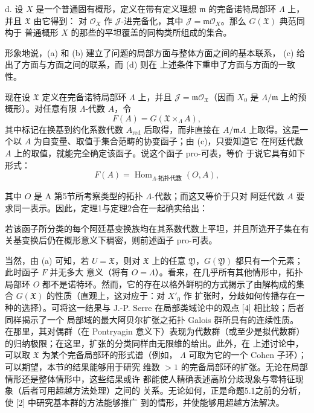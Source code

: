 \noindent d. 设 $X$ 是一个普通固有概形，定义在带有定义理想 $\mathfrak m$
的完备诺特局部环 $\Lambda$ 上，并且 $\mathfrak X$ 由它得到：
对 $\mathcal O_X$ 作 $\mathcal J$-进完备化，其中
$\mathcal J=\mathfrak m\mathcal O_X$。那么 $G(\mathfrak X)$ 典范同构于
普通概形 $X$ 的那些的平坦覆盖的同构类所组成的集合。

形象地说，(a) 和 (b) 建立了问题的局部方面与整体方面之间的基本联系，
(c) 给出了方面与方面之间的联系，而 (d) 则在
上述条件下重申了方面与方面的一致性。

现在设 $\mathfrak X$ 定义在完备诺特局部环 $\Lambda$ 上，并且
$\mathcal J=\mathfrak m\mathcal O_{\mathfrak X}$（因而 $X_0$ 是
$\Lambda/\mathfrak m$ 上的预概形）。对任意有限 $\Lambda$-代数 $A$，令
\[
  F(A)=G(\mathfrak X\times_\Lambda A),
\]
其中标记在换基到约化系数代数 $A_{\mathrm{red}}$ 后取得，而非直接在 $A/\mathfrak mA$ 上取得。这是一个以 $A$ 为自变量、取值于集合范畴的协变函子；由 (c)，只要知道它
在阿廷代数 $A$ 上的取值，就能完全确定该函子。说这个函子 pro-可表，等价
于说它具有如下形式：
\[
  F(A)=\operatorname{Hom}_{\Lambda\text{-拓扑代数}}(O,A),
\]

其中 $O$ 是 A 第5节所考察类型的拓扑 $\Lambda$-代数；而这又等价于只对
阿廷代数 $A$ 要求同一表示。因此，定理1与定理2合在一起确实给出：

 若该函子所分类的每个阿廷基变换族均在其系数代数上平坦，并且所选开子集在有关基变换后仍在概形意义下稠密，则前述函子 pro-可表。

当然，由 (a) 可知，若 $U=\mathfrak X$，则对 $\mathfrak X$ 上的任意
$\mathfrak Y$，$G(\mathfrak Y)$ 都只有一个元素；此时函子 $F$ 并无多大
意义（将有 $O=\Lambda$）。看来，在几乎所有其他情形中，拓扑局部环 $O$
都不是诺特环。然而，它的存在以格外鲜明的方式揭示了由解构成的集合
$G(\mathfrak X)$ 的性质（直观上，这对应于：对 $X'_0$ 作
扩张时，分歧如何传播存在一种的选择）。可将这一结果与
J.-P. Serre 在局部类域论中的观点 [4] 相比较；后者同样揭示了一个
局部域的最大阿贝尔扩张之拓扑 Galois 群所具有的连续性质。
在那里，其对偶群（在 Pontryagin 意义下）表现为代数群（或至少是拟代数群）
的归纳极限；在这里，扩张的分类同样由无限维的给出。此外，在
上述讨论中，可以取 $\mathfrak X$ 为某个完备局部环的形式谱（例如，
$\Lambda$ 可取为它的一个 Cohen 子环）；可以期望，本节的结果能够用于研究
维数 $>1$ 的完备局部环的扩张。无论在局部情形还是整体情形中，这些结果或许
都能使人精确表述高阶分歧现象与零特征现象（后者可用超越方法处理）之间的
关系。无论如何，正是命题5.1之前的分析，使 [2] 中研究基本群的方法能够推广
到的情形，并使能够用超越方法解决。

